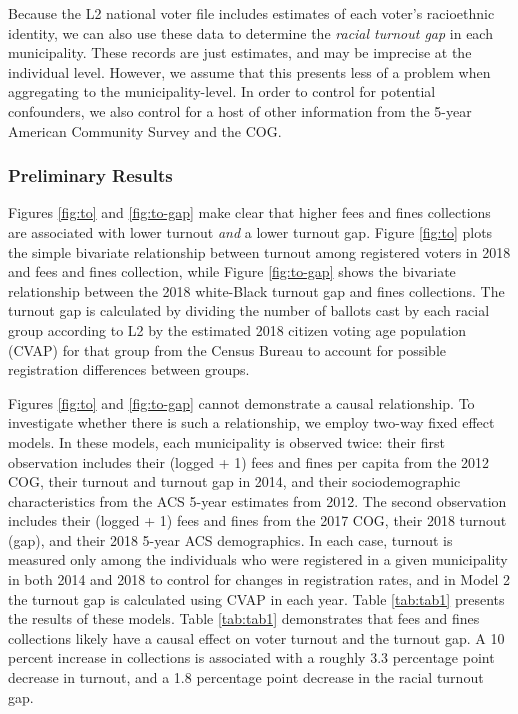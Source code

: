 \documentclass[
  12pt,
]{article}
\begin{document}
Because the L2 national voter file includes estimates of each voter's racioethnic identity, we can also use these data to determine the \emph{racial turnout gap} in each municipality. These records are just estimates, and may be imprecise at the individual level. However, we assume that this presents less of a problem when aggregating to the municipality-level. In order to control for potential confounders, we also control for a host of other information from the 5-year American Community Survey and the COG.

\hypertarget{preliminary-results}{%
\subsubsection*{Preliminary Results}\label{preliminary-results}}

Figures \ref{fig:to} and \ref{fig:to-gap} make clear that higher fees and fines collections are associated with lower turnout \emph{and} a lower turnout gap. Figure \ref{fig:to} plots the simple bivariate relationship between turnout among registered voters in 2018 and fees and fines collection, while Figure \ref{fig:to-gap} shows the bivariate relationship between the 2018 white-Black turnout gap and fines collections. The turnout gap is calculated by dividing the number of ballots cast by each racial group according to L2 by the estimated 2018 citizen voting age population (CVAP) for that group from the Census Bureau to account for possible registration differences between groups.

Figures \ref{fig:to} and \ref{fig:to-gap} cannot demonstrate a causal relationship. To investigate whether there is such a relationship, we employ two-way fixed effect models. In these models, each municipality is observed twice: their first observation includes their (logged + 1) fees and fines per capita from the 2012 COG, their turnout and turnout gap in 2014, and their sociodemographic characteristics from the ACS 5-year estimates from 2012. The second observation includes their (logged + 1) fees and fines from the 2017 COG, their 2018 turnout (gap), and their 2018 5-year ACS demographics. In each case, turnout is measured only among the individuals who were registered in a given municipality in both 2014 and 2018 to control for changes in registration rates, and in Model 2 the turnout gap is calculated using CVAP in each year. Table \ref{tab:tab1} presents the results of these models. Table \ref{tab:tab1} demonstrates that fees and fines collections likely have a causal effect on voter turnout and the turnout gap. A 10 percent increase in collections is associated with a roughly 3.3 percentage point decrease in turnout, and a 1.8 percentage point decrease in the racial turnout gap.
\end{document}

